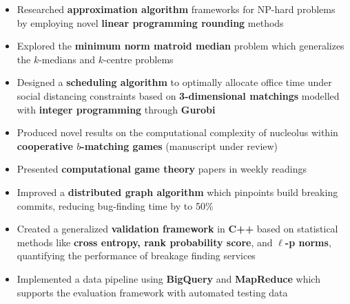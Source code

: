 \documentclass[10pt,a4paper,ragged2e]{altacv}
\begin{document}
\begin{paracol}{2}
\makecvheader

\begin{itemize}
    \item Researched \textbf{approximation algorithm} frameworks for NP-hard problems
      by employing novel \textbf{linear programming rounding} methods
    \item Explored the \textbf{minimum norm matroid median} problem
      which generalizes the $k$-medians and $k$-centre problems
\end{itemize}

\divider

\begin{itemize}
    \item Designed a \textbf{scheduling algorithm} to optimally allocate office time under social distancing constraints
      based on \textbf{3-dimensional matchings} modelled with \textbf{integer programming} through \textbf{Gurobi}
    \item Produced novel results on the computational complexity of nucleolus
      within \textbf{cooperative $b$-matching games}
      (manuscript under review)
    \item Presented \textbf{computational game theory} papers in weekly readings
\end{itemize}

\divider

\begin{itemize}
    \item Improved a \textbf{distributed graph algorithm} which pinpoints build breaking commits,
      reducing bug-finding time by to 50\%
    \item Created a generalized \textbf{validation framework} in \textbf{C++}
      based on statistical methods like \textbf{cross entropy, rank probability score}, and \textbf{$\ell$-p norms},
      quantifying the performance of breakage finding services
    \item Implemented a data pipeline using \textbf{BigQuery} and \textbf{MapReduce}
      which supports the evaluation framework with automated testing data
\end{itemize}


\end{paracol}
\end{document}
